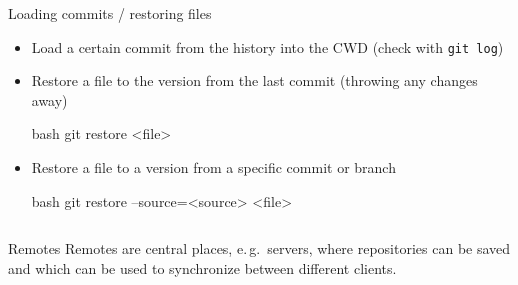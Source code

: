 \begin{frame}[fragile]{Loading commits / restoring files}
  \begin{itemize}
    \item Load a certain commit from the history into the CWD (check with \texttt{git log}) \\
    \item Restore a file to the version from the last commit (throwing any changes away)
      \begin{code}{bash}
        git restore <file>
      \end{code}
    \item Restore a file to a version from a specific commit or branch
      \begin{code}{bash}
        git restore --source=<source> <file>
      \end{code}
  \end{itemize}
  \begin{tabu}{>{\ttfamily}l X[,L]}
  \end{tabu}
\end{frame}

\begin{frame}{Remotes}
  Remotes are central places, e.\,g.\ servers, where repositories can be saved and which can be used to synchronize between different clients.
  \begin{center}
  \end{center}
\end{frame}

